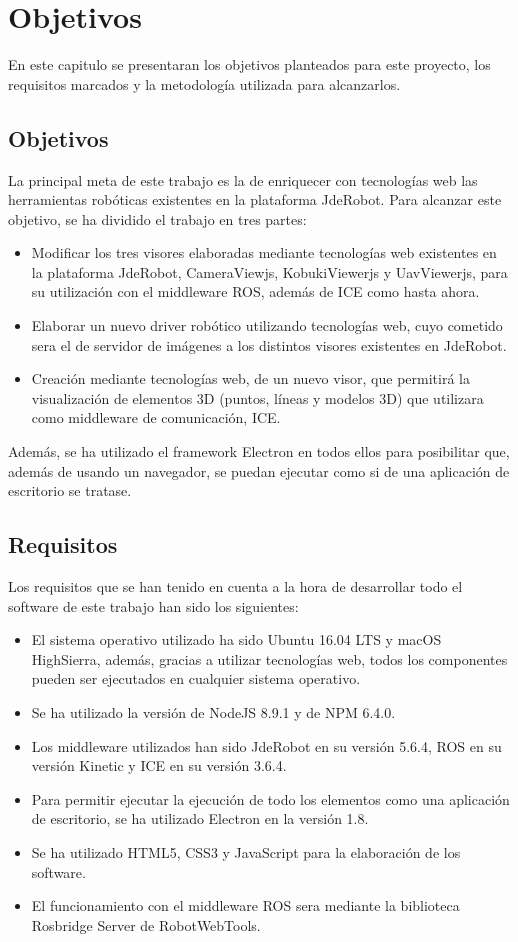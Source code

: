 \chapter{Objetivos}\label{cap.objetivos}
En este capitulo se presentaran los objetivos planteados para este proyecto, los requisitos marcados y la metodología utilizada para alcanzarlos.

\section{Objetivos}
La principal meta de este trabajo es la de enriquecer con tecnologías web las herramientas robóticas existentes en la plataforma JdeRobot. Para alcanzar este objetivo, se ha dividido el trabajo en tres partes: 
\begin{itemize}
\item Modificar los tres visores elaboradas mediante tecnologías web existentes en la plataforma JdeRobot, CameraViewjs, KobukiViewerjs y UavViewerjs, para su utilización con el middleware ROS, además de ICE como hasta ahora.
\item Elaborar un nuevo driver robótico utilizando tecnologías web, cuyo cometido sera el de servidor de imágenes a los distintos visores existentes en JdeRobot. 
\item Creación mediante tecnologías web, de un nuevo visor, que permitirá la visualización de elementos 3D (puntos, líneas y modelos 3D) que utilizara como middleware de comunicación, ICE.
\end{itemize}
Además, se ha utilizado el framework Electron en todos ellos para posibilitar que, además de usando un navegador, se puedan ejecutar como si de una aplicación de escritorio se tratase.

\section{Requisitos}
Los requisitos que se han tenido en cuenta a la hora de desarrollar todo el software de este trabajo han sido los siguientes:
\begin{itemize}
\item El sistema operativo utilizado ha sido Ubuntu 16.04 LTS y macOS HighSierra, además, gracias a utilizar tecnologías web, todos los componentes pueden ser ejecutados en cualquier sistema operativo.
\item Se ha utilizado la versión de NodeJS 8.9.1 y de NPM 6.4.0.
\item Los middleware utilizados han sido JdeRobot en su versión 5.6.4, ROS en su versión Kinetic y ICE en su versión 3.6.4.
\item Para permitir ejecutar la ejecución de todo los elementos como una aplicación de escritorio, se ha utilizado Electron en la versión 1.8.
\item Se ha utilizado HTML5, CSS3 y JavaScript para la elaboración de los software.
\item El funcionamiento con el middleware ROS sera mediante la biblioteca Rosbridge Server de RobotWebTools.
\end{itemize}

